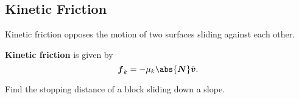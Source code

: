 \documentclass[../classical_mechanics.tex]{subfiles}
\begin{document}
        \subsection{Kinetic Friction}\label{subsec:kinetic-friction}
            Kinetic friction opposes the motion of two surfaces sliding against each other.
            \begin{definition}
                \textbf{Kinetic friction} is given by
                \begin{equation}
                    \vec{f}_k=-\mu_k\abs{\vec{N}}\uvec{v}.
                \end{equation}
            \end{definition}
            \begin{example}
                Find the stopping distance of a block sliding down a slope.
            \end{example}
\end{document}
